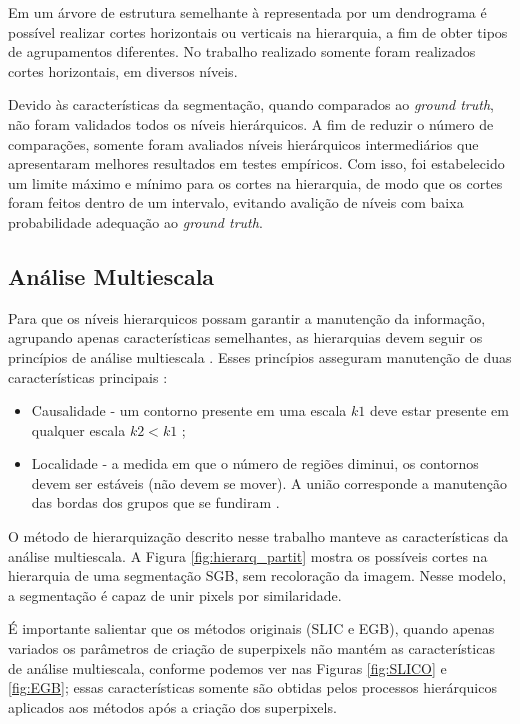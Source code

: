\begin{document}
Em um árvore de estrutura semelhante à representada por um dendrograma é possível realizar cortes horizontais ou verticais na hierarquia, a fim de obter tipos de agrupamentos diferentes. No trabalho realizado somente foram realizados cortes horizontais, em diversos níveis. 

Devido às características da segmentação, quando comparados ao \textit{ground truth}, não foram validados todos os níveis hierárquicos. A fim de reduzir o número de comparações, somente foram avaliados níveis hierárquicos intermediários que apresentaram melhores resultados em testes empíricos. Com isso, foi estabelecido um limite máximo e mínimo para os cortes na hierarquia, de modo que os cortes foram feitos dentro de um intervalo, evitando avalição de níveis com baixa probabilidade adequação ao \textit{ground truth}.


\subsection{Análise Multiescala} \label{ssec:analise_multiescala}

Para que os níveis hierarquicos possam garantir a manutenção da informação, agrupando apenas características semelhantes, as hierarquias devem seguir os princípios de análise multiescala \cite{SILVIO_ZENILTON}. Esses princípios asseguram manutenção de duas características principais \cite{SILVIO_ZENILTON}:

\begin{itemize}
 \item Causalidade - um contorno presente em uma escala $k1$ deve estar presente em qualquer escala $k2 < k1$ \cite{SILVIO_ZENILTON};
 \item Localidade - a medida em que o número de regiões diminui, os contornos devem ser estáveis (não devem se mover). A união corresponde a manutenção das bordas dos grupos que se fundiram \cite{SILVIO_ZENILTON}.
\end{itemize}

O método de hierarquização descrito nesse trabalho manteve as características da análise multiescala. A Figura \ref{fig:hierarq_partit} mostra os possíveis cortes na hierarquia de uma segmentação SGB, sem recoloração da imagem. Nesse modelo, a segmentação é capaz de unir pixels por similaridade.

É importante salientar que os métodos originais (SLIC e EGB), quando apenas variados os parâmetros de criação de superpixels não mantém as características de análise multiescala, conforme podemos ver nas Figuras \ref{fig:SLICO} e \ref{fig:EGB}; essas características somente são obtidas pelos processos hierárquicos aplicados aos métodos após a criação dos superpixels.
\end{document}
